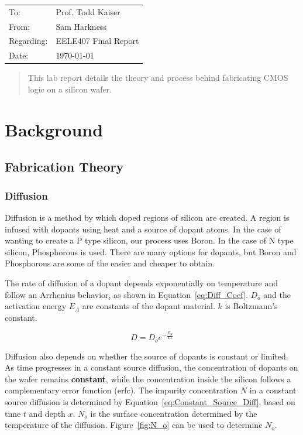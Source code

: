 \documentclass[letter,12pt]{article}
\begin{document}

\begin{flushleft}
	\begin{tabular}{l l}
		To: & Prof. Todd Kaiser \\
		From: & Sam Harkness \\
		Regarding: & EELE407 Final Report \\
		Date: & \mydate\today
	\end{tabular}
\end{flushleft}

\begin{abstract}
	This lab report details the theory and process behind fabricating CMOS logic on a silicon wafer.  
\end{abstract}

\section{Background}
	\subsection{Fabrication Theory}
		\subsubsection{Diffusion}\label{sec:Diffusion}
			\FloatBarrier
			Diffusion is a method by which doped regions of silicon are created.  A region is infused with dopants using heat and a source of dopant atoms.  In the case of wanting to create a P type silicon, our process uses Boron. In the case of N type silicon, Phosphorous is used. There are many options for dopants, but Boron and Phosphorous are some of the easier and cheaper to obtain.
			
			The rate of diffusion of a dopant depends exponentially on temperature and follow an Arrhenius behavior, as shown in Equation~\ref{eq:Diff_Coef}. $D_o$ and the activation energy $E_A$ are constants of the dopant material. $k$ is Boltzmann's constant.
			
			\begin{equation}			
				D=D_oe^{-\frac{E_A}{kT}}
				\label{eq:Diff_Coef}	
			\end{equation}
			
			Diffusion also depends on whether the source of dopants is constant or limited. As time progresses in a constant source diffusion, the concentration of dopants on the wafer remains \textbf{constant}, while the concentration inside the silicon follows a complementary error function (erfc). The impurity concentration $N$ in a constant source diffusion is determined by Equation~\ref{eq:Constant_Source_Diff}, based on time $t$ and depth $x$. $N_o$ is the surface concentration determined by the temperature of the diffusion. Figure~\ref{fig:N_o} can be used to determine $N_o$.
			
\end{document}
